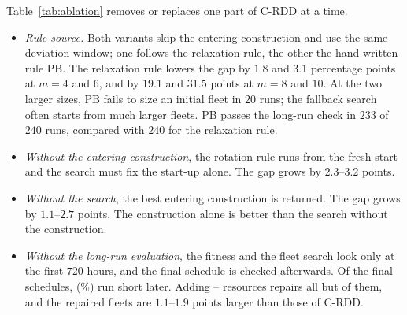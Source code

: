 Table~\ref{tab:ablation} removes or replaces one part of C-RDD at a time.
\begin{itemize}
  \item \emph{Rule source.} Both variants skip the entering construction and use the same deviation window; one follows the relaxation rule, the other the hand-written rule PB.
  The relaxation rule lowers the gap by $1.8$ and $3.1$ percentage points at $m=4$ and $6$, and by $19.1$ and $31.5$ points at $m=8$ and $10$.
  At the two larger sizes, PB fails to size an initial fleet in $20$ runs; the fallback search often starts from much larger fleets.
  PB passes the long-run check in $233$ of $240$ runs, compared with $240$ for the relaxation rule.
  \item \emph{Without the entering construction}, the rotation rule runs from the fresh start and the search must fix the start-up alone. The gap grows by $2.3$--$3.2$ points.
  \item \emph{Without the search}, the best entering construction is returned. The gap grows by $1.1$--$2.7$ points. The construction alone is better than the search without the construction.
  \item \emph{Without the long-run evaluation}, the fitness and the fleet search look only at the first $720$ hours, and the final schedule is checked afterwards. Of the \SEn{} final schedules, \SEshort{} (\SEpct\%) run short later. Adding \SEaddmin--\SEaddmax{} resources repairs all but \SEfail{} of them, and the repaired fleets are $1.1$--$1.9$ points larger than those of C-RDD.
\end{itemize}

